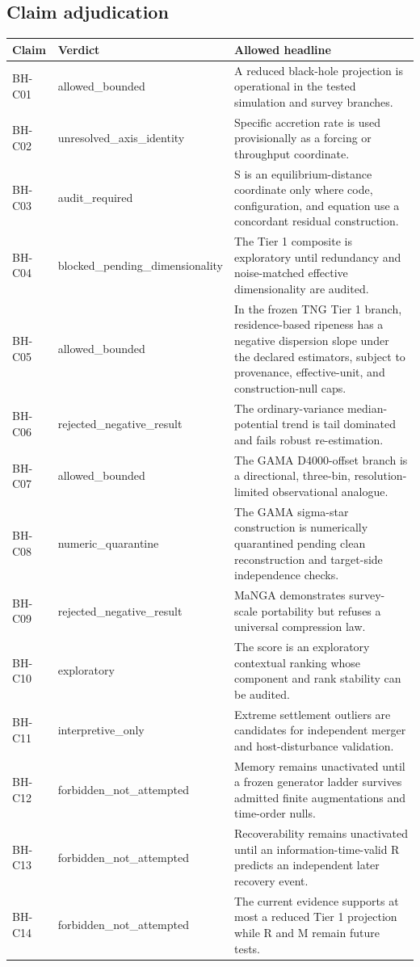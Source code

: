 \documentclass[11pt]{article}
\begin{document}
\subsection*{Claim adjudication}
\small\begin{longtable}{p{1.5cm}p{3.5cm}p{9.2cm}}\toprule Claim & Verdict & Allowed headline \\\midrule\endhead
BH-C01 & allowed\_bounded & A reduced black-hole projection is operational in the tested simulation and survey branches. \\
BH-C02 & unresolved\_axis\_identity & Specific accretion rate is used provisionally as a forcing or throughput coordinate. \\
BH-C03 & audit\_required & S is an equilibrium-distance coordinate only where code, configuration, and equation use a concordant residual construction. \\
BH-C04 & blocked\_pending\_dimensionality & The Tier 1 composite is exploratory until redundancy and noise-matched effective dimensionality are audited. \\
BH-C05 & allowed\_bounded & In the frozen TNG Tier 1 branch, residence-based ripeness has a negative dispersion slope under the declared estimators, subject to provenance, effective-unit, and construction-null caps. \\
BH-C06 & rejected\_negative\_result & The ordinary-variance median-potential trend is tail dominated and fails robust re-estimation. \\
BH-C07 & allowed\_bounded & The GAMA D4000-offset branch is a directional, three-bin, resolution-limited observational analogue. \\
BH-C08 & numeric\_quarantine & The GAMA sigma-star construction is numerically quarantined pending clean reconstruction and target-side independence checks. \\
BH-C09 & rejected\_negative\_result & MaNGA demonstrates survey-scale portability but refuses a universal compression law. \\
BH-C10 & exploratory & The score is an exploratory contextual ranking whose component and rank stability can be audited. \\
BH-C11 & interpretive\_only & Extreme settlement outliers are candidates for independent merger and host-disturbance validation. \\
BH-C12 & forbidden\_not\_attempted & Memory remains unactivated until a frozen generator ladder survives admitted finite augmentations and time-order nulls. \\
BH-C13 & forbidden\_not\_attempted & Recoverability remains unactivated until an information-time-valid R predicts an independent later recovery event. \\
BH-C14 & forbidden\_not\_attempted & The current evidence supports at most a reduced Tier 1 projection while R and M remain future tests. \\
\bottomrule\end{longtable}\normalsize
\end{document}
